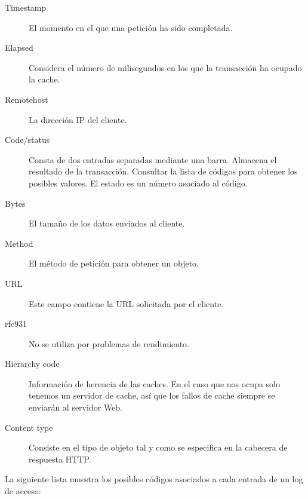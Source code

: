 \documentclass[twocolumn,twoside]{Jornadas}
\begin{document}
\begin{description}
\item[Timestamp] El momento en el que una petición ha sido completada.
\item[Elapsed] Considera el número de milisegundos en los que la transacción ha ocupado la cache.
\item[Remotehost] La dirección IP del cliente.
\item[Code/status] Consta de dos entradas separadas mediante una barra. Almacena el resultado de la transacción. Consultar la lista de códigos para obtener los posibles valores.
El estado es un número asociado al código.
\item[Bytes] El tamaño de los datos enviados al cliente.
\item[Method] El método de petición para obtener un objeto.
\item[URL] Este campo contiene la URL solicitada por el cliente.
\item[rfc931] No se utiliza por problemas de rendimiento.
\item[Hierarchy code] Información de herencia de las caches. En el caso que nos ocupa solo tenemos un servidor de cache, así que los fallos de cache siempre se enviarán al servidor Web. 
\item[Content type] Consiste en el tipo de objeto tal y como se especifica en la cabecera de respuesta HTTP.
\end{description}

La siguiente lista muestra los posibles códigos asociados a cada entrada de un log de acceso:
\end{document}
